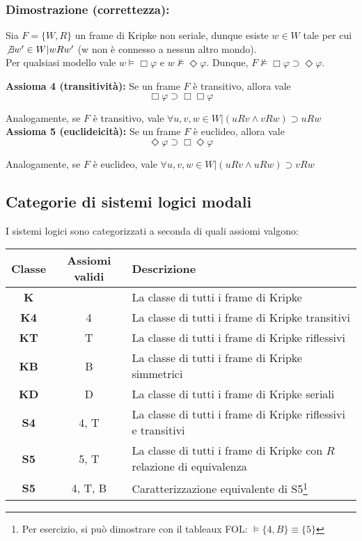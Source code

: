 \subsubsection{Dimostrazione (correttezza):}
Sia $F = \lbrace W, R \rbrace$ un frame di Kripke non seriale, dunque esiste $w \in W$ tale per cui $\not \exists w' \in W | wRw'$ (w non è connesso a nessun altro mondo).\\
Per qualsiasi modello vale $w \models \Box \varphi$ e $w \not \models \Diamond \varphi$.
Dunque, $F \not \models \Box \varphi \supset \Diamond \varphi$.

\textbf{Assioma 4 (transitività):} Se un frame $F$ è transitivo, allora vale $$\Box \varphi \supset \Box \Box \varphi$$

Analogamente, se $F$ è transitivo, vale $\forall u, v, w \in W  | (uRv \land vRw) \supset uRw$
\\

\textbf{Assioma 5 (euclideicità):} Se un frame $F$ è euclideo, allora vale $$\Diamond \varphi \supset \Box \Diamond \varphi$$

Analogamente, se $F$ è euclideo, vale $\forall u, v, w \in W  | (uRv \land uRw) \supset vRw$
\\

\subsection{Categorie di sistemi logici modali}

I sistemi logici sono categorizzati a seconda di quali assiomi valgono:
\\

\bgroup
\def\arraystretch{1.5}
\begin{tabularx}{\textwidth}{|c c X|}
\hline
Classe & Assiomi validi & Descrizione\\
\hline
\textbf{K} & &La classe di tutti i frame di Kripke\\
\textbf{K4} & 4 &La classe di tutti i frame di Kripke transitivi\\
\textbf{KT} & T &La classe di tutti i frame di Kripke riflessivi\\
\textbf{KB} & B &La classe di tutti i frame di Kripke simmetrici\\
\textbf{KD} & D &La classe di tutti i frame di Kripke seriali\\
\textbf{S4} & 4, T &La classe di tutti i frame di Kripke riflessivi e transitivi\\
\textbf{S5} & 5, T &La classe di tutti i frame di Kripke con $R$ relazione di equivalenza\\
\textbf{S5} & 4, T, B &Caratterizzazione equivalente di S5\footnote{Per esercizio, si può dimostrare con il tableaux FOL: $\models \lbrace 4, B \rbrace \equiv \lbrace 5 \rbrace$} \\
\hline
\end{tabularx}
\egroup